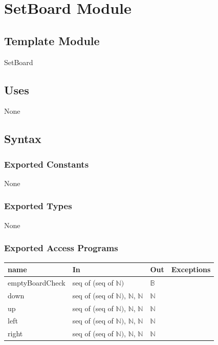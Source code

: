 \documentclass[12pt]{article}
\begin{document}
\newpage

\section* {SetBoard Module}

\subsection*{Template Module}

SetBoard

\subsection* {Uses}

None

\subsection* {Syntax}

\subsubsection* {Exported Constants}

None

\subsubsection* {Exported Types}

None

\subsubsection* {Exported Access Programs}

\begin{tabular}{| l | p{6cm} | l | p{2.5cm} |}
  \hline
  \textbf{name} & \textbf{In} & \textbf{Out} & \textbf{Exceptions}\\
  \hline
  emptyBoardCheck & seq of (seq of $\mathbb{N})$ & $\mathbb{B}$ & \\
  \hline
  down & seq of (seq of $\mathbb{N})$, $\mathbb{N}$, $\mathbb{N}$ & $\mathbb{N}$ & \\
  \hline
  up & seq of (seq of $\mathbb{N})$, $\mathbb{N}$, $\mathbb{N}$ & $\mathbb{N}$ & \\
  \hline
  left & seq of (seq of $\mathbb{N})$, $\mathbb{N}$, $\mathbb{N}$ & $\mathbb{N}$ & \\
  \hline
  right & seq of (seq of $\mathbb{N})$, $\mathbb{N}$, $\mathbb{N}$ & $\mathbb{N}$ & \\
  \hline
\end{tabular}
\end{document}
